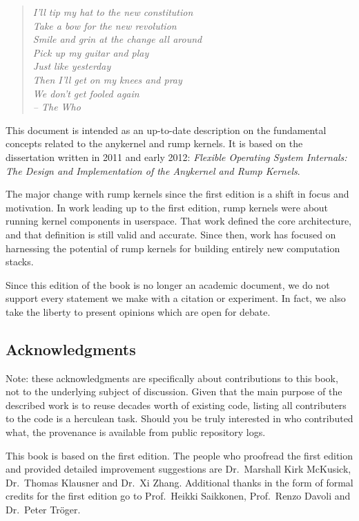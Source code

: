 \documentclass[openright]{tkkdiss}
\begin{document}
\begin{preface}

\begin{verse}
\textit{I'll tip my hat to the new constitution\\
Take a bow for the new revolution\\
Smile and grin at the change all around\\
Pick up my guitar and play\\
Just like yesterday\\
Then I'll get on my knees and pray\\
We don't get fooled again\\
-- The Who}
\end{verse}

This document is intended as an up-to-date description on the fundamental
concepts related to the anykernel and rump kernels.  It is based on the
dissertation written in 2011 and early 2012: \textit{Flexible
Operating System Internals: The Design and Implementation of the Anykernel
and Rump Kernels}.

The major change with rump kernels since the first edition is a shift
in focus and motivation.  In work leading up to the first edition, rump
kernels were about running kernel components in userspace.  That work
defined the core architecture, and that definition is still valid and
accurate.  Since then, work has focused on harnessing the potential
of rump kernels for building entirely new computation stacks.

Since this edition of the book is no longer an academic
document, we do not support every statement we make with a citation
or experiment.  In fact, we also take the liberty to present opinions
which are open for debate.

\subsection*{Acknowledgments}

Note: these acknowledgments are specifically about contributions to
this book, not to the underlying subject of discussion.  Given that
the main purpose of the described work is to reuse decades worth of
existing code, listing all contributers to the code is a herculean task.
Should you be truly interested in who contributed what, the provenance
is available from public repository logs.

This book is based on the first edition.  The people who proofread
the first edition and provided detailed improvement suggestions are
Dr.\ Marshall Kirk McKusick, Dr.\ Thomas Klausner and Dr.\ Xi Zhang.
Additional thanks in the form of formal credits for the first edition go to
Prof.\ Heikki Saikkonen, Prof.\ Renzo Davoli and Dr.\ Peter Tr\"{o}ger.


\end{preface}
\end{document}
